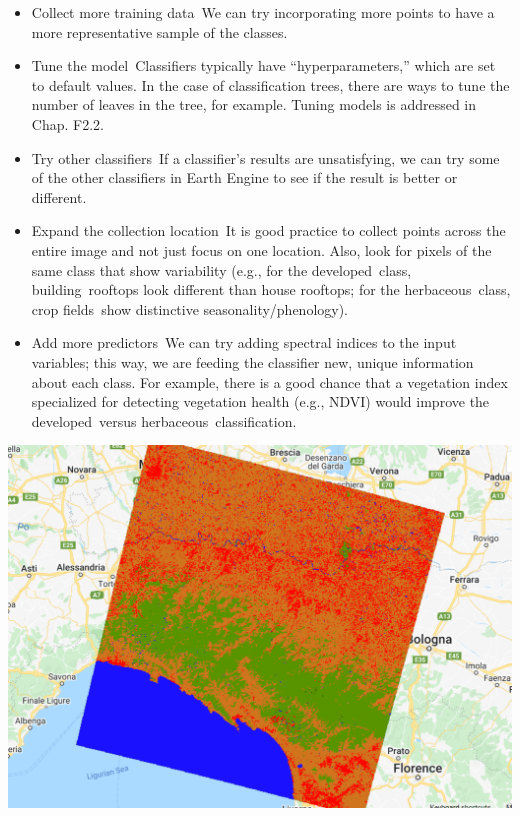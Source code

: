 \documentclass[
  letterpaper,
  DIV=11,
  numbers=noendperiod]{scrreprt}
\providecommand{\tightlist}{%
  \setlength{\itemsep}{0pt}\setlength{\parskip}{0pt}}\usepackage{longtable,booktabs,array}
\begin{document}
\begin{itemize}
\tightlist
\item
  Collect more training data~We can try incorporating more points to
  have a more representative sample of the classes.
\item
  Tune the model~Classifiers typically have ``hyperparameters,'' which
  are set to default values. In the case of classification trees, there
  are ways to tune the number of leaves in the tree, for example. Tuning
  models is addressed in Chap. F2.2.
\item
  Try other classifiers~If a classifier's results are unsatisfying, we
  can try some of the other classifiers in Earth Engine to see if the
  result is better or different.
\item
  Expand the collection location~It is good practice to collect points
  across the entire image and not just focus on one location. Also, look
  for pixels of the same class that show variability (e.g., for the
  developed~class, building~rooftops look different than house rooftops;
  for the herbaceous~class, crop fields~show distinctive
  seasonality/phenology).~
\item
  Add more predictors~We can try adding spectral indices to the input
  variables; this way, we are feeding the classifier new, unique
  information about each class. For example, there is a good chance that
  a vegetation index specialized for detecting vegetation health (e.g.,
  NDVI) would improve the developed~versus herbaceous~classification.
\end{itemize}

\includegraphics{./F2/image21.png}
\end{document}
